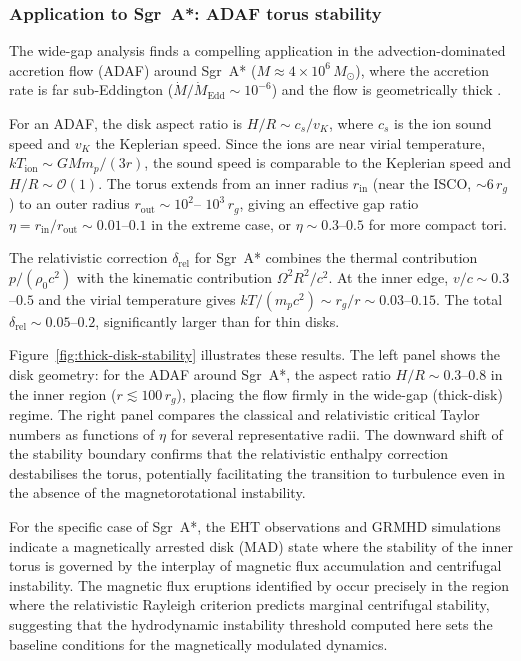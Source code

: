 \subsubsection{Application to Sgr~A*: ADAF torus stability}

The wide-gap analysis finds a compelling application in the
advection-dominated accretion flow (ADAF) around Sgr~A*
($M\approx 4\times 10^{6}\,M_{\odot}$), where the accretion rate is
far sub-Eddington ($\dot{M}/\dot{M}_{\mathrm{Edd}}\sim 10^{-6}$) and
the flow is geometrically thick \citep{NarayanYi1994,AbramowiczFragile2013}.

For an ADAF, the disk aspect ratio is $H/R\sim c_{s}/v_{K}$, where
$c_{s}$ is the ion sound speed and $v_{K}$ the Keplerian speed.
Since the ions are near virial temperature,
$kT_{\mathrm{ion}}\sim GM m_{p}/(3r)$, the sound speed is comparable
to the Keplerian speed and $H/R\sim\mathcal{O}(1)$.  The torus
extends from an inner radius $r_{\mathrm{in}}$ (near the ISCO,
$\sim 6\,r_{g}$) to an outer radius $r_{\mathrm{out}}\sim 10^{2}$--
$10^{3}\,r_{g}$, giving an effective gap ratio
$\eta=r_{\mathrm{in}}/r_{\mathrm{out}}\sim 0.01$--$0.1$ in the
extreme case, or $\eta\sim 0.3$--$0.5$ for more compact tori.

The relativistic correction $\delta_{\mathrm{rel}}$ for Sgr~A*
combines the thermal contribution $p/(\rho_{0}c^{2})$ with the
kinematic contribution $\Omega^{2}R^{2}/c^{2}$.  At the inner edge,
$v/c\sim 0.3$--$0.5$ and the virial temperature gives
$kT/(m_{p}c^{2})\sim r_{g}/r\sim 0.03$--$0.15$.  The total
$\delta_{\mathrm{rel}}\sim 0.05$--$0.2$, significantly larger than
for thin disks.

Figure~\ref{fig:thick-disk-stability} illustrates these results.  The
left panel shows the disk geometry: for the ADAF around Sgr~A*, the
aspect ratio $H/R\sim 0.3$--$0.8$ in the inner region ($r\lesssim
100\,r_{g}$), placing the flow firmly in the wide-gap (thick-disk)
regime.  The right panel compares the classical and relativistic
critical Taylor numbers as functions of $\eta$ for several
representative radii.  The downward shift of the stability boundary
confirms that the relativistic enthalpy correction destabilises the
torus, potentially facilitating the transition to turbulence even in
the absence of the magnetorotational instability.

For the specific case of Sgr~A*, the EHT observations
\citep{EHT2019M87V} and GRMHD simulations \citep{Porth2019}
indicate a magnetically arrested disk (MAD) state where the
stability of the inner torus is governed by the interplay of
magnetic flux accumulation and centrifugal instability.  The
magnetic flux eruptions identified by \citet{Ripperda2022} occur
precisely in the region where the relativistic Rayleigh criterion
predicts marginal centrifugal stability, suggesting that the
hydrodynamic instability threshold computed here sets the
baseline conditions for the magnetically modulated dynamics.

